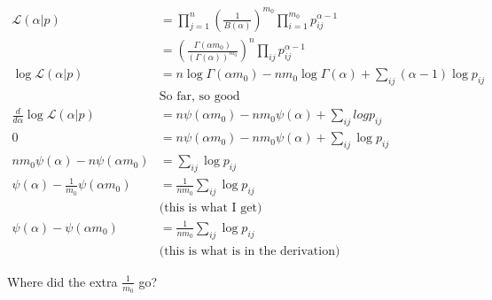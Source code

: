 \documentclass{article}
\begin{document}
\begin{align*}
\mathscr{L}(\alpha|p) &= \prod_{j=1}^n \left(\frac{1}{B(\alpha)}\right)^{m_0} \prod_{i=1}^{m_0} p_{ij}^{\alpha - 1}\\
& = \left(\frac{\Gamma(\alpha m_0)}{\left(\Gamma(\alpha)\right)^{m_0}}\right)^n \prod_{ij} p^{\alpha-1}_{ij}\\
\log \mathscr{L}(\alpha|p) & = n \log \Gamma(\alpha m_0) - nm_0\log\Gamma(\alpha) + \sum_{ij}(\alpha-1)\log p_{ij}\\
&    \text{So far, so good}\\
\frac{d}{d\alpha}\log \mathscr{L}(\alpha|p) &= n\psi(\alpha m_0) - nm_0\psi(\alpha) + \sum_{ij} log p_{ij}\\
0 &= n\psi(\alpha m_0) - nm_0\psi(\alpha) + \sum_{ij} \log p_{ij} \\
nm_0\psi(\alpha) - n\psi(\alpha m_0) &= \sum_{ij} \log p_{ij}\\
\psi(\alpha) - \frac{1}{m_0}\psi(\alpha m_0) & = \frac{1}{nm_0}\sum_{ij} \log p_{ij}\\&\text{(this is what I get)}\\
\psi(\alpha) - \psi(\alpha m_0) & = \frac{1}{nm_0}\sum_{ij} \log p_{ij}\\&\text{(this is what is in the derivation)}
\end{align*}

Where did the extra $\frac{1}{m_0}$ go?
\end{document}
